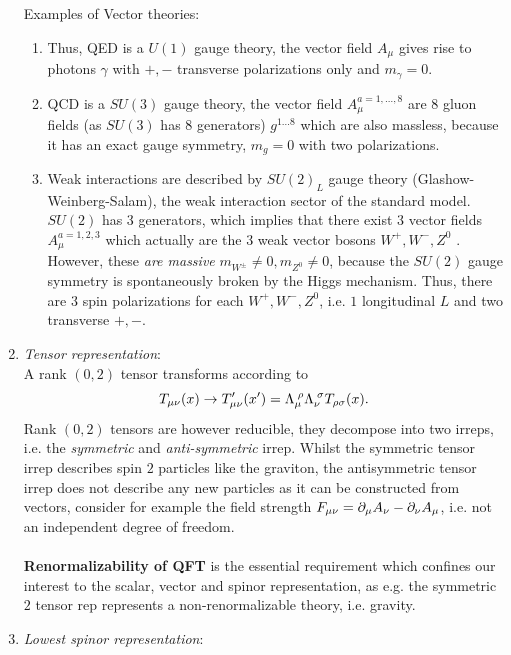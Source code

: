 \begin{enumerate}
	 Examples of Vector theories:\\
	 \begin{enumerate} 
	 \item Thus, QED is a $U(1)$ gauge theory, the vector field $A_\mu$ gives rise to photons $\gamma$ with $+,-$ transverse polarizations only and $m_\gamma=0$.
	 \item QCD is a $SU(3)$ gauge theory, the vector field $A^{a=1,\dots,8}_\mu$ are $8$ gluon fields (as $SU(3)$ has $8$ generators) $g^{1\dots 8}$ which are also massless, because it has an exact gauge symmetry, $m_g=0$ with two polarizations.
	 \item Weak interactions are described by $SU(2)_L$ gauge theory (Glashow-Weinberg-Salam), the weak interaction sector of the standard model. $SU(2)$ has $3$ generators, which implies that there exist $3$ vector fields $A^{a=1,2,3}_\mu$ which actually are the $3$ weak vector bosons $W^+,W^-,Z^0$ . However, these \emph{are massive} $m_{W^\pm}\neq 0, m_{Z^0}\neq 0$, because the $SU(2)$ gauge symmetry is spontaneously broken by the Higgs mechanism. Thus, there are $3$ spin polarizations for each $W^+,W^-,Z^0$, i.e. $1$ longitudinal $L$ and two transverse $+,-$.
	 \end{enumerate}
 \item \emph{Tensor representation}:\\
 A rank $(0,2)$ tensor transforms according to 
 \begin{equation}
 T_{\mu \nu}(x) \rightarrow T^\prime_{\mu \nu}(x^\prime) = \Lambda^{\;\rho}_\mu \Lambda^{\;\sigma}_\nu T_{\rho \sigma}(x).
 \end{equation}
 Rank $(0,2)$ tensors are however reducible, they decompose into two irreps, i.e. the \emph{symmetric} and \emph{anti-symmetric} irrep. Whilst the symmetric tensor irrep describes spin $2$ particles like the graviton, the antisymmetric tensor irrep does not describe any new particles as it can be constructed from vectors, consider for example the field strength $F_{\mu \nu} =\partial_\mu A_\nu - \partial_\nu A_\mu$, i.e. not an independent degree of freedom.\\
 \\
 \textbf{Renormalizability of QFT} is the essential requirement which confines our interest to the scalar, vector and spinor representation, as e.g. the symmetric $2$ tensor rep represents a non-renormalizable theory, i.e. gravity.
 \item \emph{Lowest spinor representation}:\\

\end{enumerate}
